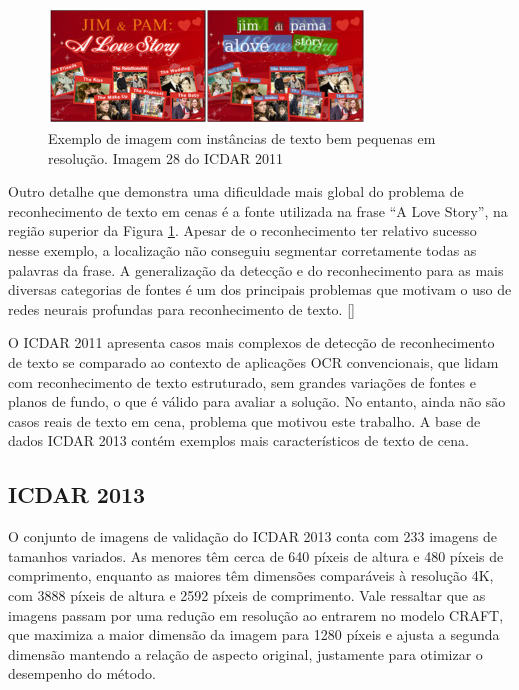 \begin{figure}
    \centering
    \includegraphics[width=0.75\textwidth]{figs/resultados-icdar11-03.png}
    \caption{Exemplo de imagem com instâncias de texto bem pequenas em resolução. Imagem 28 do ICDAR 2011}
    \label{fig:results_icdar11_03}
\end{figure}

Outro detalhe que demonstra uma dificuldade mais global do problema de reconhecimento de texto em cenas é a fonte utilizada 
na frase “A Love Story”, na região superior da Figura \ref{fig:results_icdar11_03}. Apesar de o reconhecimento ter relativo 
sucesso nesse exemplo, a localização não conseguiu segmentar corretamente todas as palavras da frase. A generalização da detecção 
e do reconhecimento para as mais diversas categorias de fontes é um dos principais problemas que motivam o uso de redes neurais 
profundas para reconhecimento de texto. []

O ICDAR 2011 apresenta casos mais complexos de detecção de reconhecimento de texto se comparado ao contexto de aplicações OCR 
convencionais, que lidam com reconhecimento de texto estruturado, sem grandes variações de fontes e planos de fundo, o que é 
válido para avaliar a solução. No entanto, ainda não são casos reais de texto em cena, problema que motivou este trabalho. 
A base de dados ICDAR 2013 contém exemplos mais característicos de texto de cena.


\subsection{ICDAR 2013}\label{sec:results_icdar_2013}

O conjunto de imagens de validação do ICDAR 2013 conta com 233 imagens de tamanhos variados. As menores têm cerca de 640 píxeis 
de altura e 480 píxeis de comprimento, enquanto as maiores têm dimensões comparáveis à resolução 4K, com 3888 píxeis de altura e 
2592 píxeis de comprimento. Vale ressaltar que as imagens passam por uma redução em resolução ao entrarem no modelo CRAFT, que 
maximiza a maior dimensão da imagem para 1280 píxeis e ajusta a segunda dimensão mantendo a relação de aspecto original, justamente 
para otimizar o desempenho do método.

